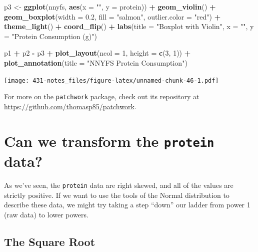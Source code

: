 \documentclass[
]{book}
\newenvironment{Shaded}{\begin{snugshade}}{\end{snugshade}}
\newcommand{\DataTypeTok}[1]{\textcolor[rgb]{0.13,0.29,0.53}{#1}}
\newcommand{\DecValTok}[1]{\textcolor[rgb]{0.00,0.00,0.81}{#1}}
\newcommand{\FloatTok}[1]{\textcolor[rgb]{0.00,0.00,0.81}{#1}}
\newcommand{\KeywordTok}[1]{\textcolor[rgb]{0.13,0.29,0.53}{\textbf{#1}}}
\newcommand{\NormalTok}[1]{#1}
\newcommand{\OperatorTok}[1]{\textcolor[rgb]{0.81,0.36,0.00}{\textbf{#1}}}
\newcommand{\StringTok}[1]{\textcolor[rgb]{0.31,0.60,0.02}{#1}}
\begin{document}
\begin{Shaded}
\begin{Highlighting}[]
\NormalTok{p3 <-}\StringTok{ }\KeywordTok{ggplot}\NormalTok{(nnyfs, }\KeywordTok{aes}\NormalTok{(}\DataTypeTok{x =} \StringTok{""}\NormalTok{, }\DataTypeTok{y =}\NormalTok{ protein)) }\OperatorTok{+}
\StringTok{    }\KeywordTok{geom_violin}\NormalTok{() }\OperatorTok{+}
\StringTok{    }\KeywordTok{geom_boxplot}\NormalTok{(}\DataTypeTok{width =} \FloatTok{0.2}\NormalTok{, }\DataTypeTok{fill =} \StringTok{"salmon"}\NormalTok{, }
                 \DataTypeTok{outlier.color =} \StringTok{"red"}\NormalTok{) }\OperatorTok{+}
\StringTok{    }\KeywordTok{theme_light}\NormalTok{() }\OperatorTok{+}
\StringTok{    }\KeywordTok{coord_flip}\NormalTok{() }\OperatorTok{+}
\StringTok{    }\KeywordTok{labs}\NormalTok{(}\DataTypeTok{title =} \StringTok{"Boxplot with Violin"}\NormalTok{,}
         \DataTypeTok{x =} \StringTok{""}\NormalTok{, }\DataTypeTok{y =} \StringTok{"Protein Consumption (g)"}\NormalTok{)}

\NormalTok{p1 }\OperatorTok{+}\StringTok{ }\NormalTok{p2 }\OperatorTok{-}\StringTok{ }\NormalTok{p3 }\OperatorTok{+}\StringTok{ }\KeywordTok{plot_layout}\NormalTok{(}\DataTypeTok{ncol =} \DecValTok{1}\NormalTok{, }\DataTypeTok{height =} \KeywordTok{c}\NormalTok{(}\DecValTok{3}\NormalTok{, }\DecValTok{1}\NormalTok{)) }\OperatorTok{+}
\StringTok{    }\KeywordTok{plot_annotation}\NormalTok{(}\DataTypeTok{title =} \StringTok{"NNYFS Protein Consumption"}\NormalTok{)}
\end{Highlighting}
\end{Shaded}

\texttt{[image: 431-notes\_files/figure-latex/unnamed-chunk-46-1.pdf]}

For more on the \texttt{patchwork} package, check out its repository at \url{https://github.com/thomasp85/patchwork}.

\hypertarget{can-we-transform-the-protein-data}{%
\section{\texorpdfstring{Can we transform the \texttt{protein} data?}{Can we transform the protein data?}}\label{can-we-transform-the-protein-data}}

As we've seen, the \texttt{protein} data are right skewed, and all of the values are strictly positive. If we want to use the tools of the Normal distribution to describe these data, we might try taking a step ``down'' our ladder from power 1 (raw data) to lower powers.

\hypertarget{the-square-root}{%
\subsection{The Square Root}\label{the-square-root}}
\end{document}
